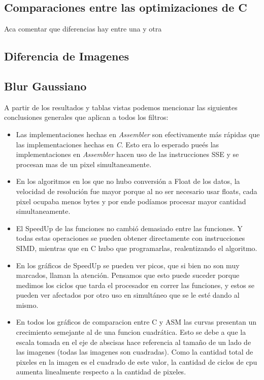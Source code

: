 \subsection{Comparaciones entre las optimizaciones de C}

Aca comentar que diferencias hay entre una y otra 
   
\subsection{Diferencia de Imagenes}
  
\subsection{Blur Gaussiano}
  

  
  \newpage
  
A partir de los resultados y tablas vistas podemos mencionar las siguientes conclusiones generales que aplican a todos los filtros:
  \begin{itemize}
    \item Las implementaciones hechas en \textit{Assembler} son efectivamente m\'as r\'apidas que las implementaciones hechas en \textit{C}. Esto era lo esperado pue\'es las implementaciones en \textit{Assembler} hacen uso de las instrucciones SSE y se procesan mas de un pixel simultaneamente.
    \item En los algoritmos en los que no hubo conversi\'on a Float de los datos, la velocidad de resoluci\'on fue mayor porque al no ser necesario usar floats, cada pixel ocupaba menos bytes y por ende pod\'iamos procesar mayor cantidad simultaneamente. 
	\item El SpeedUp de las funciones no cambi\'o demasiado entre las funciones. 
	Y todas estas operaciones se pueden obtener directamente con instrucciones SIMD, mientras que en C hubo que programarlas, realentizando el algoritmo.
	\item En los gr\'aficos de SpeedUp se pueden ver picos, que si bien no son muy marcados, llaman	la atenci\'on. Pensamos que esto puede suceder porque medimos los ciclos que tarda el procesador en correr las funciones, y estos se pueden ver afectados por otro uso en simult\'aneo que se le est\'e dando al mismo. 
    \item En todos los gr\'aficos de comparacion entre C y ASM las curvas presentan un crecimiento semejante al de una funcion cuadr\'atica. Esto se debe a que la escala tomada en el eje de abscisas hace referencia al tama\~no de un lado de las imagenes (todas las imagenes son cuadradas). Como la cantidad total de pixeles en la imagen es el cuadrado de este valor, la cantidad de ciclos de cpu aumenta linealmente respecto a la cantidad de pixeles.
   \end{itemize}
  






